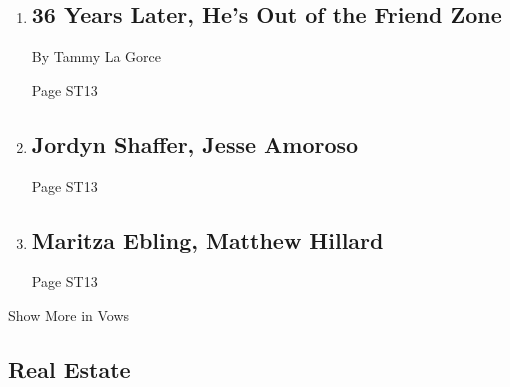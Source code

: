 \begin{enumerate}
\def\labelenumi{\arabic{enumi}.}
\item
  \href{/2018/04/20/fashion/weddings/36-years-later-hes-out-of-the-friend-zone.html}{}

  \hypertarget{36-years-later-hes-out-of-the-friend-zone}{%
  \subsection{36 Years Later, He's Out of the Friend
  Zone}\label{36-years-later-hes-out-of-the-friend-zone}}

  By Tammy La Gorce

  Page ST13
\item
  \href{/2018/04/22/fashion/weddings/jordyn-shaffer-jesse-amoroso.html}{}

  \hypertarget{jordyn-shaffer-jesse-amoroso}{%
  \subsection{Jordyn Shaffer, Jesse
  Amoroso}\label{jordyn-shaffer-jesse-amoroso}}

  Page ST13
\item
  \href{/2018/04/22/fashion/weddings/maritza-ebling-matthew-hillard.html}{}

  \hypertarget{maritza-ebling-matthew-hillard}{%
  \subsection{Maritza Ebling, Matthew
  Hillard}\label{maritza-ebling-matthew-hillard}}

  Page ST13
\end{enumerate}

Show More in Vows

\hypertarget{real-estate}{%
\subsection{Real Estate}\label{real-estate}}


